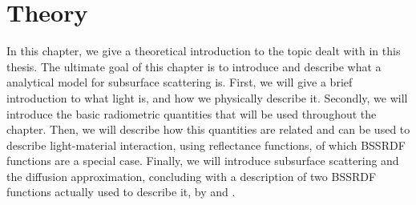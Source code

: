 \chapter{Theory}

In this chapter, we give a theoretical introduction to the topic dealt with in this thesis. The ultimate goal of this chapter is to introduce and describe what a analytical model for subsurface scattering is. First, we will give a brief introduction to what light is, and how we physically describe it. Secondly, we will introduce the basic radiometric quantities that will be used throughout the chapter. Then, we will describe how this quantities are related and can be used to describe light-material interaction, using reflectance functions, of which BSSRDF functions are a special case. Finally, we will introduce subsurface scattering and the diffusion approximation, concluding with a description of two BSSRDF functions actually used to describe it, by \cite{Jensen:2001:PMS:383259.383319} and \cite{IMM2013-06646}.


